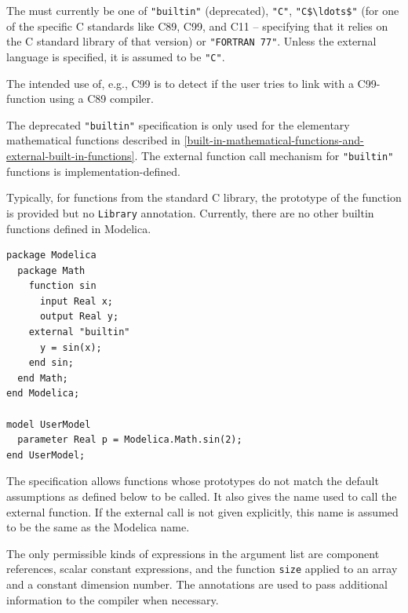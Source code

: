The  must currently be one of {\lstinline!"builtin"!} (deprecated), {\lstinline!"C"!}, {\lstinline!"C$\ldots$"!} (for one of the specific C standards like C89, C99, and C11 -- specifying that it relies on the C standard library of that version) or {\lstinline!"FORTRAN 77"!}.
Unless the external language is specified, it is assumed to be {\lstinline!"C"!}.

\begin{nonnormative}
The intended use of, e.g., C99 is to detect if the user tries to link with a C99-function using a C89 compiler.
\end{nonnormative}

The deprecated {\lstinline!"builtin"!} specification is only used for the elementary mathematical functions described in \cref{built-in-mathematical-functions-and-external-built-in-functions}.
The external function call mechanism for {\lstinline!"builtin"!} functions is implementation-defined.

\begin{nonnormative}
Typically, for functions from the standard C library, the prototype of the function is provided but no {\lstinline!Library!} annotation.
Currently, there are no other builtin functions defined in Modelica.
\end{nonnormative}

\begin{example}
\begin{lstlisting}[language=modelica]
package Modelica
  package Math
    function sin
      input Real x;
      output Real y;
    external "builtin"
      y = sin(x);
    end sin;
  end Math;
end Modelica;

model UserModel
  parameter Real p = Modelica.Math.sin(2);
end UserModel;
\end{lstlisting}
\end{example}

The  specification allows functions whose prototypes do not match the default assumptions as defined below to be called.
It also gives the name used to call the external function.
If the external call is not given explicitly, this name is assumed to be the same as the Modelica name.

The only permissible kinds of expressions in the argument list are component references, scalar constant expressions, and the function {\lstinline!size!} applied to an array and a constant dimension number.
The annotations are used to pass additional information to the compiler when necessary.

